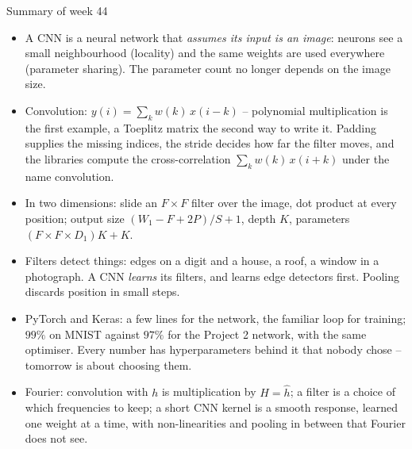 \documentclass[10pt,aspectratio=169]{beamer}
\begin{document}
\begin{frame}{Summary of week 44}
\small
\begin{itemize}
  \item A CNN is a neural network that \emph{assumes its input is an
        image}: neurons see a small neighbourhood (locality) and the same
        weights are used everywhere (parameter sharing).  The parameter
        count no longer depends on the image size.
  \item Convolution: $y(i)=\sum_kw(k)\,x(i-k)$ -- polynomial multiplication
        is the first example, a Toeplitz matrix the second way to write it.
        Padding supplies the missing indices, the stride decides how far
        the filter moves, and the libraries compute the cross-correlation
        $\sum_kw(k)\,x(i+k)$ under the name convolution.
  \item In two dimensions: slide an $F\times F$ filter over the image,
        dot product at every position; output size
        $(W_1-F+2P)/S+1$, depth $K$, parameters $(F\times F\times D_1)K+K$.
  \item Filters detect things: edges on a digit and a house, a roof, a
        window in a photograph.  A CNN \emph{learns} its filters, and learns
        edge detectors first.  Pooling discards position in small steps.
  \item PyTorch and Keras: a few lines for the network, the familiar loop
        for training; $99\%$ on MNIST against $97\%$ for the Project 2
        network, with the same optimiser.  Every number has hyperparameters
        behind it that nobody chose -- tomorrow is about choosing them.
  \item Fourier: convolution with $h$ is multiplication by $H=\hat h$; a
        filter is a choice of which frequencies to keep; a short CNN kernel
        is a smooth response, learned one weight at a time, with
        non-linearities and pooling in between that Fourier does not see.
\end{itemize}
\end{frame}
\end{document}
